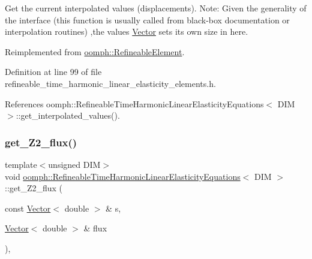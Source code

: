 Get the current interpolated values (displacements). Note\+: Given the generality of the interface (this function is usually called from black-\/box documentation or interpolation routines) ,the values \hyperlink{classoomph_1_1Vector}{Vector} sets its own size in here. 



Reimplemented from \hyperlink{classoomph_1_1RefineableElement_ad9a4f92880668a2373326d8306365c43}{oomph\+::\+Refineable\+Element}.



Definition at line 99 of file refineable\+\_\+time\+\_\+harmonic\+\_\+linear\+\_\+elasticity\+\_\+elements.\+h.



References oomph\+::\+Refineable\+Time\+Harmonic\+Linear\+Elasticity\+Equations$<$ D\+I\+M $>$\+::get\+\_\+interpolated\+\_\+values().

\mbox{\label{classoomph_1_1RefineableTimeHarmonicLinearElasticityEquations_a04b7ef358d9598ddece9cbd961b6f956}} 
\subsubsection{\texorpdfstring{get\+\_\+\+Z2\+\_\+flux()}{get\_Z2\_flux()}}
{\footnotesize\ttfamily template$<$unsigned D\+IM$>$ \\
void \hyperlink{classoomph_1_1RefineableTimeHarmonicLinearElasticityEquations}{oomph\+::\+Refineable\+Time\+Harmonic\+Linear\+Elasticity\+Equations}$<$ D\+IM $>$\+::get\+\_\+\+Z2\+\_\+flux (\begin{DoxyParamCaption}\item[{const \hyperlink{classoomph_1_1Vector}{Vector}$<$ double $>$ \&}]{s,  }\item[{\hyperlink{classoomph_1_1Vector}{Vector}$<$ double $>$ \&}]{flux }\end{DoxyParamCaption})\hspace{0.3cm}{\ttfamily [inline]}, {\ttfamily [virtual]}}



